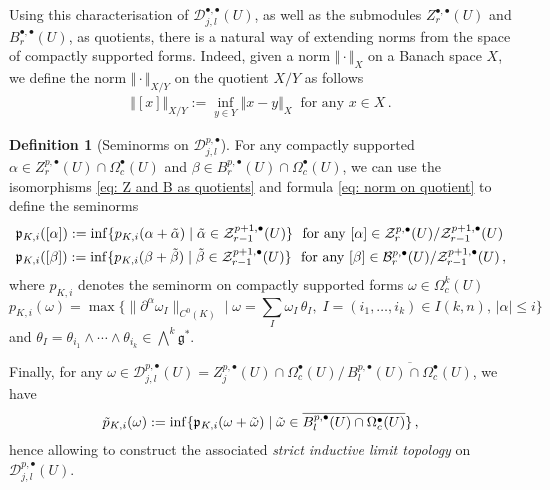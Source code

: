 \documentclass[dvipsnames]{amsart}
\theoremstyle{definition}
\newtheorem{definition}[theorem]{Definition}
\theoremstyle{definition}
\numberwithin{equation}{section}
\begin{document}
Using this characterisation of $\mathscr{D}_{j,l}^{\bullet,\bullet}(U)$, as well as the submodules $Z_r^{\bullet,\bullet}(U)$ and $B_r^{\bullet,\bullet}(U)$, as quotients, there is a natural way of extending norms from the space of compactly supported forms. Indeed, given a norm $\Vert\cdot\Vert_{X}$ on a Banach space $X$, we define the norm $\Vert\cdot\Vert_{X/Y}$ on the quotient $X/Y$ as follows
\begin{align}\label{eq: norm on quotient}
    \Vert [x]\Vert_{X/Y}:=\inf_{y\in Y}\Vert x-y\Vert_X\ \text{ for any }x\in X\,.
\end{align}
\begin{definition}[Seminorms on $\mathscr D_{j,l}^{p,\bullet}$]
    

For any compactly supported $\alpha\in Z_r^{p,\bullet}(U)\cap\Omega_c^\bullet(U)$ and $\beta\in B_r^{p,\bullet}(U)\cap\Omega_c^\bullet(U)$, we can use the isomorphisms \eqref{eq: Z and B as quotients} and formula \eqref{eq: norm on quotient} to define the seminorms 
\begin{align*}
    &\mathfrak{p}_{K,i}([\alpha]):=\inf\{p_{K,i}(\alpha+\Tilde{\alpha})\mid \Tilde{\alpha}\in \mathcal{Z}_{r-1}^{p+1,\bullet}(U)\}\ \text{ for any }[\alpha]\in\mathcal{Z}_r^{p,\bullet}(U)/\mathcal{Z}_{r-1}^{p+1,\bullet}(U)\\&\mathfrak{p}_{K,i}([\beta]):=\inf\{p_{K,i}(\beta+\Tilde{\beta})\mid \Tilde{\beta}\in\mathcal{Z}_{r-1}^{p+1,\bullet}(U)\}\ \text{ for any }[\beta]\in\mathcal{B}_r^{p,\bullet}(U)/\mathcal{Z}_{r-1}^{p+1,\bullet}(U)\,,
\end{align*}
where $p_{K,i}$ denotes the seminorm on compactly supported forms $\omega\in\Omega^k_c(U)$
\[
p_{K,i}(\omega)=\max\big\{\|\partial^\alpha \omega_I\|_{C^0(K)}\mid \omega=\sum_I \omega_I \,\theta_I, \;I=(i_1,\ldots,i_k)\in I(k,n),\, |\alpha|\le i  \big\}
\]
and  $\theta_I=\theta_{i_1}\wedge\cdots\wedge \theta_{i_k}\in\bigwedge^k\mathfrak{g}^\ast$.


Finally, for any $\omega\in\mathscr D_{j,l}^{p,\bullet}(U)=Z_j^{p,\bullet}(U)\cap\Omega_c^\bullet(U)/ \,\overline{B_l^{p,\bullet}(U)\cap\Omega_c^\bullet(U)}$, we have
\begin{align*}
    \Tilde{p}_{K,i}(\omega):=\inf\{\mathfrak{p}_{K,i}(\omega+\Tilde{\omega})\mid \Tilde{\omega}\in\overline{B_{l}^{p,\bullet}(U)\cap\Omega^\bullet_c(U)}\}\,,
\end{align*}
hence allowing to construct the associated {\em strict inductive limit topology} on $\mathscr D_{j,l}^{p,\bullet}(U)$.
\end{definition}
\end{document}
